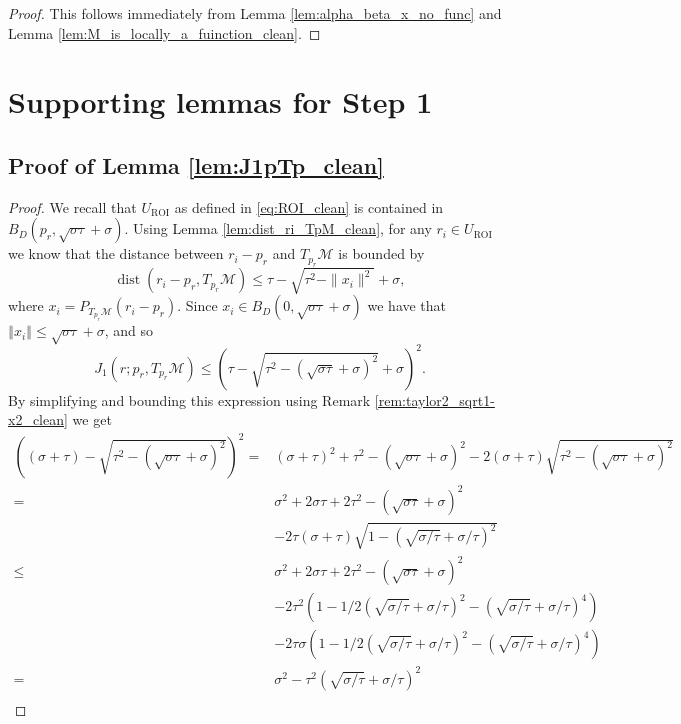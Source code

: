 \documentclass[12pt]{article}
\theoremstyle{remark}
\newcommand{\MM}{\mathcal{M}}
\newcommand{\norm}[1]{\left\Vert #1 \right\Vert}
\newcommand{\dist}{\operatorname{dist}}
\begin{document}
\begin{appendices}
\begin{proof}
 This follows immediately from Lemma \ref{lem:alpha_beta_x_no_func} and Lemma \ref{lem:M_is_locally_a_fuinction_clean}.
\end{proof}
\section{Supporting lemmas for Step 1}
\subsection{Proof of Lemma \ref{lem:J1pTp_clean}} \label{subsec:proof_lem_J1pTp_clean}
\begin{proof}
We recall that $ U_\textrm{ROI} $ as defined in \eqref{eq:ROI_clean} is contained in $ B_D({p_r}, \sqrt{\sigma\tau} + \sigma) $.
Using Lemma \ref{lem:dist_ri_TpM_clean}, for any $r_i\in U_\textrm{ROI}$ we know that the distance between $r_i - p_r$ and $ T_{{p_r}}\MM $ is bounded by 
\begin{equation}\label{eq:d_ri_Tp_clean}
\dist(r_i - p_r,T_{{p_r}}\MM) \leq \tau-\sqrt{\tau^2-\|x_i\|^2}  + \sigma
,\end{equation}
where $ x_i = P_{T_{p_r}\MM}(r_i - p_r) $.
Since $ x_i \in B_D(0, \sqrt{\sigma\tau}+\sigma )$ we have that $\norm{x_i} \leq \sqrt{\sigma\tau}+\sigma $, and so
\[
J_1(r; {p_r}, T_{{p_r}}\MM) \leq \left(\tau-\sqrt{\tau^2-(\sqrt{\sigma\tau}+\sigma)^2} + \sigma\right)^2 
.\]
By simplifying and bounding this expression using Remark \ref{rem:taylor2_sqrt1-x2_clean} we get
	\begin{align*}
		\left((\sigma+\tau)-\sqrt{\tau^2-(\sqrt{\sigma\tau}+\sigma)^2}\right)^2 = & (\sigma+\tau)^2 + \tau^2-(\sqrt{\sigma\tau}+\sigma)^2 - 2(\sigma+\tau) \sqrt{\tau^2-(\sqrt{\sigma\tau}+\sigma)^2}\\
		= &
		\sigma^2 + 2\sigma\tau + 2 \tau^2 -  (\sqrt{\sigma\tau}+\sigma)^2 \\
		&- 2\tau(\sigma+\tau) \sqrt{1-(\sqrt{\sigma/\tau}+\sigma/\tau)^2}\\
		\leq &
		\sigma^2 + 2\sigma\tau + 2 \tau^2 - (\sqrt{\sigma\tau}+\sigma)^2\\
		& - 2\tau^2 (1-1/2 (\sqrt{\sigma/\tau}+\sigma/\tau)^2- (\sqrt{\sigma/\tau}+\sigma/\tau)^4 )\\& - 2\tau\sigma (1-1/2 (\sqrt{\sigma/\tau}+\sigma/\tau)^2- (\sqrt{\sigma/\tau}+\sigma/\tau)^4)\\
		= &
		\sigma^2 -  \tau^2(\sqrt{\sigma/\tau}+\sigma/\tau)^2 \\

\end{align*}
\end{proof}
\end{appendices}
\end{document}
